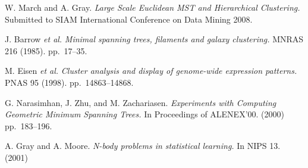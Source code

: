 \documentclass[twoside,leqno, 12pt]{article}
\begin{document}
\begin{thebibliography}{99}

\footnotesize
{}
W. March and A. Gray.  \emph{Large Scale Euclidean MST and Hierarchical Clustering.}  Submitted to SIAM International Conference on Data Mining 2008.

J. Barrow \emph{et al.}  \emph{Minimal spanning trees, filaments and galaxy clustering.}  MNRAS 216 (1985).  pp.~17--35.

M. Eisen \emph{et al.}  \emph{Cluster analysis and display of genome-wide expression patterns.}  PNAS 95 (1998).  pp.~14863--14868.


G. Narasimhan, J. Zhu, and M. Zachariasen.  \emph{Experiments with Computing Geometric Minimum Spanning Trees.}  In Proceedings of ALENEX'00.  (2000)  pp.~183--196.


A. Gray and A. Moore.  \emph{N-body problems in statistical learning.}  In NIPS 13.  (2001)

\end{thebibliography}
\end{document}
